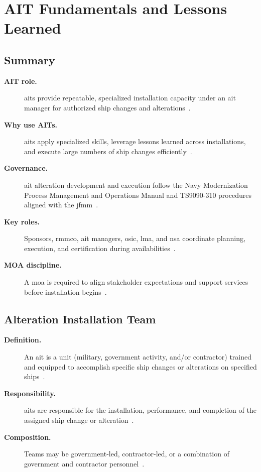 \documentclass[../main.tex]{subfiles}
\begin{document}
\section{AIT Fundamentals and Lessons Learned}

\subsection{Summary}
\begin{description}
  \item[\textbf{AIT role.}] \acp{ait} provide repeatable, specialized installation capacity under an \ac{ait} manager for authorized ship changes and alterations~\autocite{edo-4-1-4-ait-fundamentals-2025,TS9090-310}.
  \item[\textbf{Why use AITs.}] \acp{ait} apply specialized skills, leverage lessons learned across installations, and execute large numbers of ship changes efficiently~\autocite{edo-4-1-4-ait-fundamentals-2025}.
  \item[\textbf{Governance.}] \ac{ait} alteration development and execution follow the Navy Modernization Process Management and Operations Manual and TS9090-310 procedures aligned with the \ac{jfmm}~\autocite{edo-4-1-4-ait-fundamentals-2025,SL720-AA-MAN-030,JFMM-VolVI-RevD-Chg5-2025,TS9090-310}.
  \item[\textbf{Key roles.}] Sponsors, \ac{rmmco}, \ac{ait} managers, \ac{osic}, \ac{lma}, and \ac{nsa} coordinate planning, execution, and certification during availabilities~\autocite{edo-4-1-4-ait-fundamentals-2025,TS9090-310}.
  \item[\textbf{MOA discipline.}] A \ac{moa} is required to align stakeholder expectations and support services before installation begins~\autocite{edo-4-1-4-ait-fundamentals-2025}.
\end{description}

\subsection{Alteration Installation Team}
\begin{description}
  \item[\textbf{Definition.}] An \ac{ait} is a unit (military, government activity, and/or contractor) trained and equipped to accomplish specific ship changes or alterations on specified ships~\autocite{edo-4-1-4-ait-fundamentals-2025,TS9090-310}.
  \item[\textbf{Responsibility.}] \acp{ait} are responsible for the installation, performance, and completion of the assigned ship change or alteration~\autocite{edo-4-1-4-ait-fundamentals-2025}.
  \item[\textbf{Composition.}] Teams may be government-led, contractor-led, or a combination of government and contractor personnel~\autocite{edo-4-1-4-ait-fundamentals-2025}.
\end{description}
\end{document}

